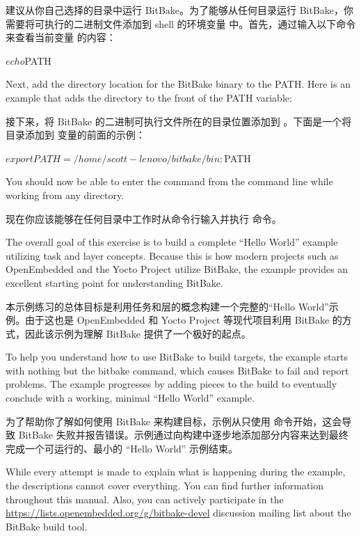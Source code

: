 建议从你自己选择的目录中运行 BitBake。为了能够从任何目录运行 BitBake，你需要将可执行的二进制文件添加到 shell 的环境变量  中。首先，通过输入以下命令来查看当前变量 的内容：

\begin{pyglist}
$ echo $PATH
\end{pyglist}

Next, add the directory location for the BitBake binary to the PATH. Here is an example that adds the  directory to the front of the PATH variable:

接下来，将 BitBake 的二进制可执行文件所在的目录位置添加到 。下面是一个将  目录添加到  变量的前面的示例：

\begin{pyglist}
$ export PATH=/home/scott-lenovo/bitbake/bin:$PATH
\end{pyglist}

You should now be able to enter the  command from the command line while working from any directory.

现在你应该能够在任何目录中工作时从命令行输入并执行  命令。


The overall goal of this exercise is to build a complete “Hello World” example utilizing task and layer concepts. Because this is how modern projects such as OpenEmbedded and the Yocto Project utilize BitBake, the example provides an excellent starting point for understanding BitBake.

本示例练习的总体目标是利用任务和层的概念构建一个完整的“Hello World”示例。由于这也是 OpenEmbedded 和 Yocto Project 等现代项目利用 BitBake 的方式，因此该示例为理解 BitBake 提供了一个极好的起点。

To help you understand how to use BitBake to build targets, the example starts with nothing but the bitbake command, which causes BitBake to fail and report problems. The example progresses by adding pieces to the build to eventually conclude with a working, minimal “Hello World” example.

为了帮助你了解如何使用 BitBake 来构建目标，示例从只使用  命令开始，这会导致 BitBake 失败并报告错误。示例通过向构建中逐步地添加部分内容来达到最终完成一个可运行的、最小的 ``Hello World'' 示例结束。

While every attempt is made to explain what is happening during the example, the descriptions cannot cover everything. You can find further information throughout this manual. Also, you can actively participate in the \url{https://lists.openembedded.org/g/bitbake-devel} discussion mailing list about the BitBake build tool.

